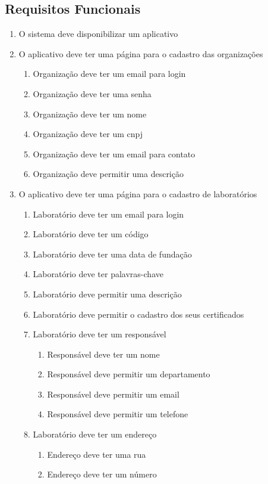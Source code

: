 \subsection{Requisitos Funcionais}\label{subsec:ia1}
\begin{enumerate}
    \item O sistema deve disponibilizar um aplicativo
    \item O aplicativo deve ter uma página para o cadastro das organizações
	\begin{enumerate}
		\item Organização deve ter um email para login
		\item Organização deve ter uma senha
		\item Organização deve ter um nome
		\item Organização deve ter um cnpj
		\item Organização deve ter um email para contato
		\item Organização deve permitir uma descrição
	\end{enumerate}
    \item O aplicativo deve ter uma página para o cadastro de laboratórios
	\begin{enumerate}
		\item Laboratório deve ter um email para login
		\item Laboratório deve ter um código
		\item Laboratório deve ter uma data de fundação
		\item Laboratório deve ter palavras-chave
		\item Laboratório deve permitir uma descrição
		\item Laboratório deve permitir o cadastro dos seus certificados
		\item Laboratório deve ter um responsável
		\begin{enumerate}
			\item Responsável deve ter um nome
			\item Responsável deve permitir um departamento
			\item Responsável deve permitir um email
			\item Responsável deve permitir um telefone
		\end{enumerate}
		\item Laboratório deve ter um endereço
		\begin{enumerate}
			\item Endereço deve ter uma rua
			\item Endereço deve ter um número

\end{enumerate}
\end{enumerate}
\end{enumerate}
